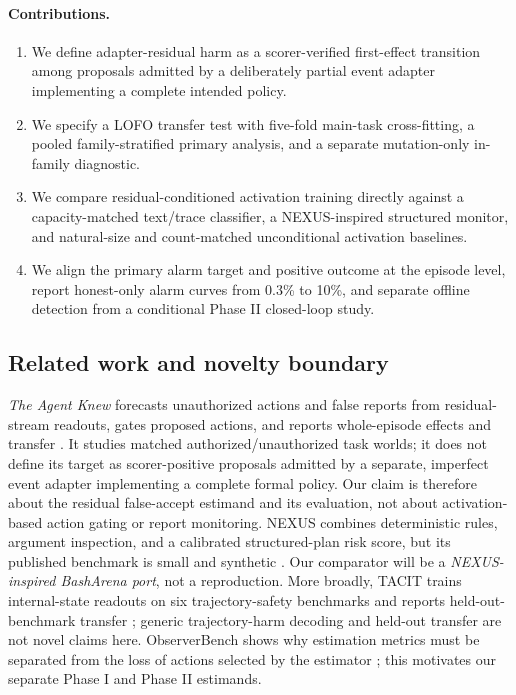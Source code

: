 \documentclass[11pt]{article}
\begin{document}
\paragraph{Contributions.}
\begin{enumerate}
  \item We define adapter-residual harm as a scorer-verified first-effect transition among proposals admitted by a deliberately partial event adapter implementing a complete intended policy.
  \item We specify a LOFO transfer test with five-fold main-task cross-fitting, a pooled family-stratified primary analysis, and a separate mutation-only in-family diagnostic.
  \item We compare residual-conditioned activation training directly against a capacity-matched text/trace classifier, a NEXUS-inspired structured monitor, and natural-size and count-matched unconditional activation baselines.
  \item We align the primary alarm target and positive outcome at the episode level, report honest-only alarm curves from 0.3\% to 10\%, and separate offline detection from a conditional Phase II closed-loop study.
\end{enumerate}

\subsection{Related work and novelty boundary}

\emph{The Agent Knew} forecasts unauthorized actions and false reports from residual-stream readouts, gates proposed actions, and reports whole-episode effects and transfer \cite{theagentknew}. It studies matched authorized/unauthorized task worlds; it does not define its target as scorer-positive proposals admitted by a separate, imperfect event adapter implementing a complete formal policy. Our claim is therefore about the residual false-accept estimand and its evaluation, not about activation-based action gating or report monitoring. NEXUS combines deterministic rules, argument inspection, and a calibrated structured-plan risk score, but its published benchmark is small and synthetic \cite{nexus}. Our comparator will be a \emph{NEXUS-inspired BashArena port}, not a reproduction. More broadly, TACIT trains internal-state readouts on six trajectory-safety benchmarks and reports held-out-benchmark transfer \cite{tacit}; generic trajectory-harm decoding and held-out transfer are not novel claims here. ObserverBench shows why estimation metrics must be separated from the loss of actions selected by the estimator \cite{observerbench}; this motivates our separate Phase I and Phase II estimands.
\end{document}
